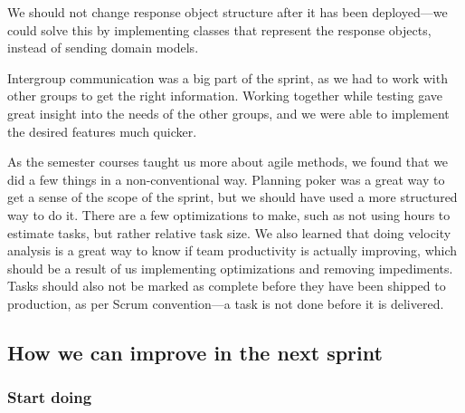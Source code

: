 We should not change response object structure after it has been deployed---we could solve this by implementing classes that represent the response objects, instead of sending domain models. 

Intergroup communication was a big part of the sprint, as we had to work with other groups to get the right information. 
Working together while testing gave great insight into the needs of the other groups, and we were able to implement the desired features much quicker.

As the semester courses taught us more about agile methods, we found that we did a few things in a non-conventional way. Planning poker was a great way to get a sense of the scope of the sprint, but we should have used a more structured way to do it. 
There are a few optimizations to make, such as not using hours to estimate tasks, but rather relative task size.
We also learned that doing velocity analysis is a great way to know if team productivity is actually improving, which should be a result of us implementing optimizations and removing impediments.
Tasks should also not be marked as complete before they have been shipped to production, as per Scrum convention---a task is not done before it is delivered.

\subsection{How we can improve in the next sprint}

\subsubsection{Start doing}

